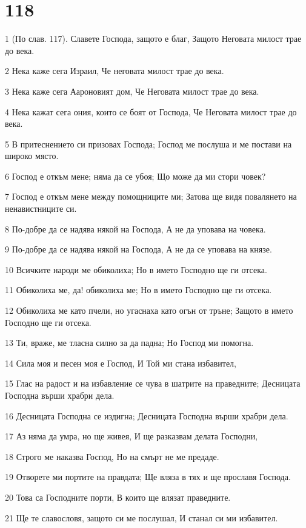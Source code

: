 \chapter{118}

\par 1 (По слав. 117). Славете Господа, защото е благ, Защото Неговата милост трае до века.
\par 2 Нека каже сега Израил, Че неговата милост трае до века.
\par 3 Нека каже сега Аароновият дом, Че Неговата милост трае до века.
\par 4 Нека кажат сега ония, които се боят от Господа, Че Неговата милост трае до века.
\par 5 В притеснението си призовах Господа; Господ ме послуша и ме постави на широко място.
\par 6 Господ е откъм мене; няма да се убоя; Що може да ми стори човек?
\par 7 Господ е откъм мене между помощниците ми; Затова ще видя повалянето на ненавистниците си.
\par 8 По-добре да се надява някой на Господа, А не да уповава на човека.
\par 9 По-добре да се надява някой на Господа, А не да се уповава на князе.
\par 10 Всичките народи ме обиколиха; Но в името Господно ще ги отсека.
\par 11 Обиколиха ме, да! обиколиха ме; Но в името Господно ще ги отсека.
\par 12 Обиколиха ме като пчели, но угаснаха като огън от тръне; Защото в името Господно ще ги отсека.
\par 13 Ти, враже, ме тласна силно за да падна; Но Господ ми помогна.
\par 14 Сила моя и песен моя е Господ, И Той ми стана избавител,
\par 15 Глас на радост и на избавление се чува в шатрите на праведните; Десницата Господна върши храбри дела.
\par 16 Десницата Господна се издигна; Десницата Господна върши храбри дела.
\par 17 Аз няма да умра, но ще живея, И ще разказвам делата Господни,
\par 18 Строго ме наказва Господ, Но на смърт не ме предаде.
\par 19 Отворете ми портите на правдата; Ще вляза в тях и ще прославя Господа.
\par 20 Това са Господните порти, В които ще влязат праведните.
\par 21 Ще те славословя, защото си ме послушал, И станал си ми избавител.
